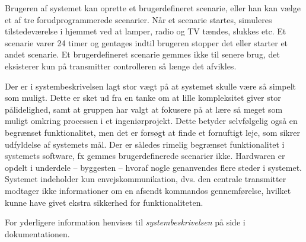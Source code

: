 Brugeren af systemet kan oprette et brugerdefineret scenarie, eller han kan vælge et af tre forudprogrammerede scenarier. 
Når et scenarie startes, simuleres tilstedeværelse i hjemmet ved at lamper, radio og TV tændes, slukkes etc. 
Et scenarie varer 24 timer og gentages indtil brugeren stopper det eller starter et andet scenarie. 
Et brugerdefineret scenarie gemmes ikke til senere brug, det eksisterer kun på transmitter controlleren så længe det afvikles. 

Der er i systembeskrivelsen lagt stor vægt på at systemet skulle være så simpelt som muligt. 
Dette er sket ud fra en tanke om at lille kompleksitet giver stor pålidelighed, samt at gruppen har valgt at fokusere på at lære så meget som muligt omkring processen i et ingeniørprojekt. 
Dette betyder selvfølgelig også en begrænset funktionalitet, men det er forsøgt at finde et fornuftigt leje, som sikrer udfyldelse af systemets mål. 
Der er således rimelig begrænset funktionalitet i systemets software, fx gemmes brugerdefinerede scenarier ikke. Hardwaren er opdelt i underdele – byggesten – hvoraf nogle genanvendes flere steder i systemet. 
Systemet indeholder kun envejskommunikation, dvs. den centrale transmitter modtager ikke informationer om en afsendt kommandos gennemførelse, hvilket kunne have givet ekstra sikkerhed for funktionaliteten. 

For yderligere information henvises til \textit{systembeskrivelsen} på side \pageref{P-Systembeskrivelse} i dokumentationen. 

\clearpage